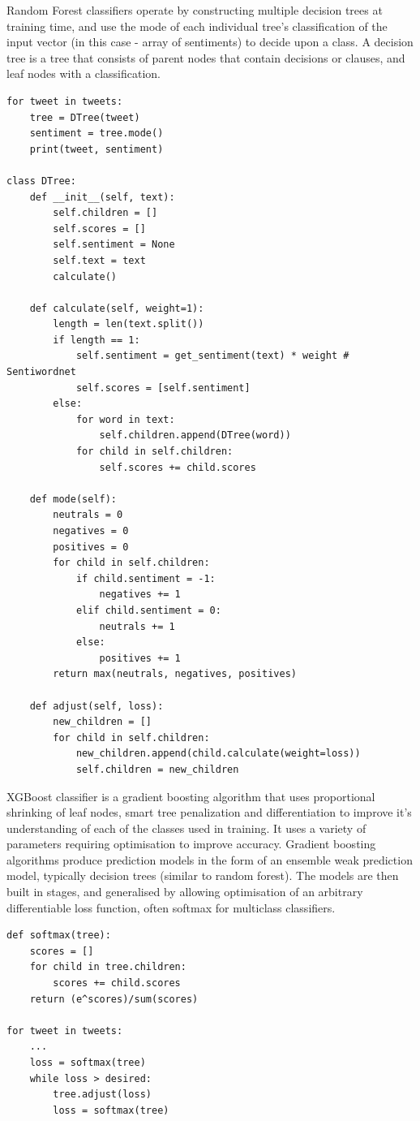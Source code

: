 \documentclass{article}
\begin{document}
Random Forest classifiers operate by constructing multiple decision trees at training time, and use the mode of each individual tree's classification of the input vector (in this case - array of sentiments) to decide upon a class.
A decision tree is a tree that consists of parent nodes that contain decisions or clauses, and leaf nodes with a classification.

\begin{lstlisting}[caption={Random Forest classifier psuedopythoncode},captionpos=b]
for tweet in tweets:
	tree = DTree(tweet)
	sentiment = tree.mode()
	print(tweet, sentiment)

class DTree:
	def __init__(self, text):
		self.children = []
		self.scores = []
		self.sentiment = None
		self.text = text
		calculate()

	def calculate(self, weight=1):
		length = len(text.split())
		if length == 1:
			self.sentiment = get_sentiment(text) * weight # Sentiwordnet
			self.scores = [self.sentiment]
		else:
			for word in text:
				self.children.append(DTree(word))
			for child in self.children:
				self.scores += child.scores

	def mode(self):
		neutrals = 0
		negatives = 0
		positives = 0
		for child in self.children:
			if child.sentiment = -1:
				negatives += 1
			elif child.sentiment = 0:
				neutrals += 1
			else:
				positives += 1
		return max(neutrals, negatives, positives)

	def adjust(self, loss):
		new_children = []
		for child in self.children:
			new_children.append(child.calculate(weight=loss))
			self.children = new_children
\end{lstlisting}

XGBoost classifier is a gradient boosting algorithm that uses proportional shrinking of leaf nodes, smart tree penalization and differentiation to improve it's understanding of each of the classes used in training.
It uses a variety of parameters requiring optimisation to improve accuracy.
Gradient boosting algorithms produce prediction models in the form of an ensemble weak prediction model, typically decision trees (similar to random forest).
The models are then built in stages, and generalised by allowing optimisation of an arbitrary differentiable loss function, often softmax for multiclass classifiers.

\begin{lstlisting}[caption={XGBoost classifier psuedopythoncode},captionpos=b]
def softmax(tree):
	scores = []
	for child in tree.children:
		scores += child.scores
	return (e^scores)/sum(scores)

for tweet in tweets:
	...
	loss = softmax(tree)
	while loss > desired:
		tree.adjust(loss)
		loss = softmax(tree)
\end{lstlisting}
\end{document}
